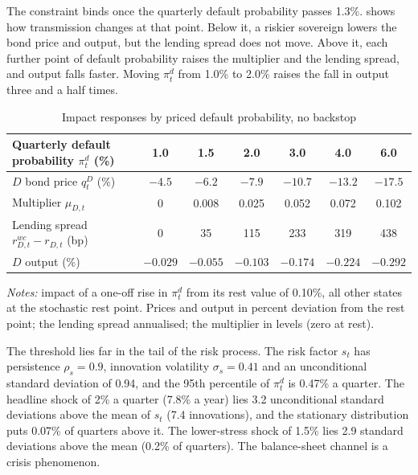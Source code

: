 The constraint binds once the quarterly default probability passes 1.3\%.
 shows how transmission changes at that point. Below it, a riskier
sovereign lowers the bond price and output, but the lending spread does not move. Above it, each
further point of default probability raises the multiplier and the lending spread, and output
falls faster. Moving $\pi^d_t$ from 1.0\% to 2.0\% raises the fall in output three and a half
times.

\begin{table}[htbp]
\centering
\caption{Impact responses by priced default probability, no backstop}
\label{tab:state-dependence}
\small
\setlength{\tabcolsep}{4pt}
\begin{tabular}{lcccccc}
\toprule
Quarterly default probability $\pi^d_t$ (\%) & 1.0 & 1.5 & 2.0 & 3.0 & 4.0 & 6.0 \\
\midrule
$D$ bond price $q^D_t$ (\%) & $-4.5$ & $-6.2$ & $-7.9$ & $-10.7$ & $-13.2$ & $-17.5$ \\
Multiplier $\mu_{D,t}$ & 0 & 0.008 & 0.025 & 0.052 & 0.072 & 0.102 \\
Lending spread $r^{wc}_{D,t}-r_{D,t}$ (bp) & 0 & 35 & 115 & 233 & 319 & 438 \\
$D$ output (\%) & $-0.029$ & $-0.055$ & $-0.103$ & $-0.174$ & $-0.224$ & $-0.292$ \\
\bottomrule
\end{tabular}
\par\medskip
\begin{minipage}{0.9\linewidth}\footnotesize
\emph{Notes:} impact of a one-off rise in $\pi^d_t$ from its rest value of 0.10\%, all other states
at the stochastic rest point. Prices and output in percent deviation from the rest point; the
lending spread annualised; the multiplier in levels (zero at rest).
\end{minipage}
\end{table}

The threshold lies far in the tail of the risk process. The risk factor $s_t$ has persistence
$\rho_s=0.9$, innovation volatility $\sigma_s=0.41$ and an unconditional standard deviation of
0.94, and the 95th percentile of $\pi^d_t$ is 0.47\% a quarter. The headline shock of 2\% a
quarter (7.8\% a year) lies 3.2 unconditional standard deviations above the mean of $s_t$ (7.4
innovations), and the stationary distribution puts 0.07\% of quarters above it. The lower-stress
shock of 1.5\% lies 2.9 standard deviations above the mean (0.2\% of quarters). The
balance-sheet channel is a crisis phenomenon.

